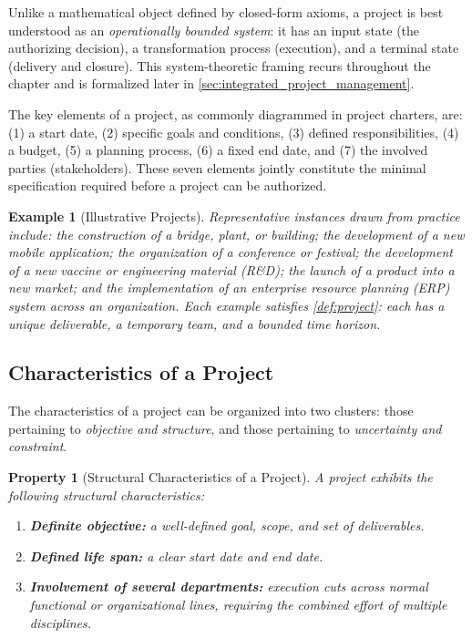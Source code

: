\documentclass[12pt, a4paper]{report}
\theoremstyle{engnotes}
\newtheorem{property}{Property}[section]
\newtheorem{example}{Example}[section]
\begin{document}
Unlike a mathematical object defined by closed-form axioms, a project is best understood as an \emph{operationally bounded system}: it has an input state (the authorizing decision), a transformation process (execution), and a terminal state (delivery and closure). This system-theoretic framing recurs throughout the chapter and is formalized later in \cref{sec:integrated_project_management}.

\begin{note}
    The key elements of a project, as commonly diagrammed in project charters, are: (1) a start date, (2) specific goals and conditions, (3) defined responsibilities, (4) a budget, (5) a planning process, (6) a fixed end date, and (7) the involved parties (stakeholders). These seven elements jointly constitute the minimal specification required before a project can be authorized.
\end{note}

\begin{example}[Illustrative Projects]\label{ex:illustrative_projects}
    Representative instances drawn from practice include: the construction of a bridge, plant, or building; the development of a new mobile application; the organization of a conference or festival; the development of a new vaccine or engineering material (R\&D); the launch of a product into a new market; and the implementation of an enterprise resource planning (ERP) system across an organization. Each example satisfies \cref{def:project}: each has a unique deliverable, a temporary team, and a bounded time horizon.
\end{example}

\subsection{Characteristics of a Project}
\label{subsec:characteristics_project}

The characteristics of a project can be organized into two clusters: those pertaining to \emph{objective and structure}, and those pertaining to \emph{uncertainty and constraint}.

\begin{property}[Structural Characteristics of a Project]\label{pty:structural_characteristics}
    A project exhibits the following structural characteristics:
    \begin{enumerate}
        \item \textbf{Definite objective:} a well-defined goal, scope, and set of deliverables.
        \item \textbf{Defined life span:} a clear start date and end date.
        \item \textbf{Involvement of several departments:} execution cuts across normal functional or organizational lines, requiring the combined effort of multiple disciplines.
    \end{enumerate}
\end{property}
\end{document}
